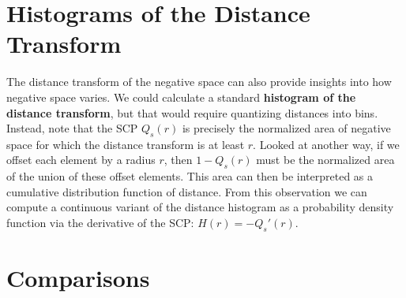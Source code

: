 \section{Histograms of the Distance Transform}
The distance transform of the negative space can also provide insights into
how negative space varies.  We could calculate a standard \textbf{histogram of the
distance transform}, but that would require quantizing distances into bins.
Instead, note that the SCP $Q_s(r)$ is precisely the normalized area of 
negative space for which the distance transform is at least $r$. 
 Looked at another way, if we offset each element by a
   radius $r$, then $1-Q_s(r)$ must be the normalized 
     area of the union of these offset elements.
This area can then be interpreted as 
a cumulative distribution function of distance.  From this observation
we can compute a continuous variant of the distance histogram as a 
probability density function via the derivative of the SCP: $H(r)=-Q_s'(r)$.



\section{Comparisons}


